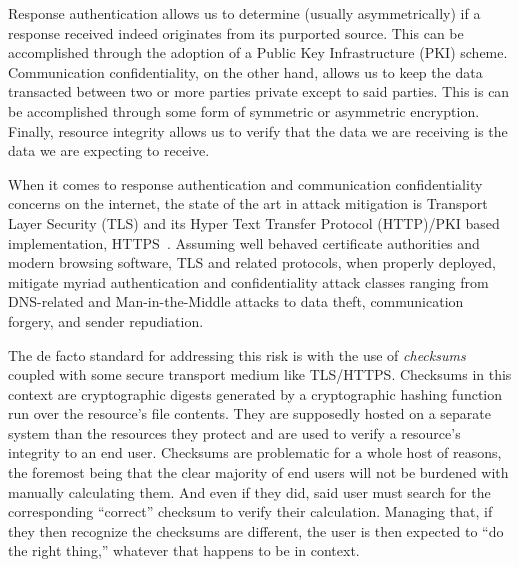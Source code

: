 Response authentication allows us to determine (usually asymmetrically) if a
response received indeed originates from its purported source. This can be
accomplished through the adoption of a Public Key Infrastructure (PKI) scheme.
Communication confidentiality, on the other hand, allows us to keep the data
transacted between two or more parties private except to said parties. This is
can be accomplished through some form of symmetric or asymmetric encryption.
Finally, resource integrity allows us to verify that the data we are receiving
is the data we are expecting to receive.


When it comes to response authentication and communication confidentiality
concerns on the internet, the state of the art in attack mitigation is Transport
Layer Security (TLS) and its Hyper Text Transfer Protocol (HTTP)/PKI based
implementation, HTTPS~\cite{TLS1.2, TLS1, TLS0, HTTPS}. Assuming well behaved
certificate authorities and modern browsing software, TLS and related protocols,
when properly deployed, mitigate myriad authentication and confidentiality
attack classes ranging from DNS-related and Man-in-the-Middle attacks to data
theft, communication forgery, and sender repudiation.


The de facto standard for addressing this risk is with the use of
\textit{checksums} coupled with some secure transport medium like TLS/HTTPS.
Checksums in this context are cryptographic digests generated by a cryptographic
hashing function run over the resource's file contents. They are supposedly
hosted on a separate system than the resources they protect and are used to
verify a resource’s integrity to an end user. Checksums are problematic for a
whole host of reasons, the foremost being that the clear majority of end users
will not be burdened with manually calculating them. And even if they did, said
user must search for the corresponding ``correct'' checksum to verify their
calculation. Managing that, if they then recognize the checksums are different,
the user is then expected to ``do the right thing,'' whatever that happens to be
in context.

